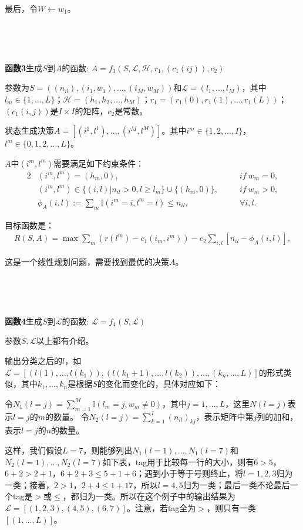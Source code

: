 \documentclass[a4paper,11pt]
{elsarticle}%
\begin{document}
最后，令$W\gets w_1$。

~

~


\textbf{函数3}生成$S$到$A$的函数: $A=f_3(S,\mathscr{L},\mathscr{H},r_1,(c_1(ij)),c_2)$

参数为$S=((n_{il}),(i_1,w_1),\ldots,(i_M,w_M))$和$\mathscr{L}=(l_1,\ldots,l_M)$，其中$l_m\in\{1,\ldots,L\}$；$\mathscr{H}=(h_1,h_2,\ldots,h_M)$；$r_1=(r_1(0),r_1(1),\ldots,r_1(L))$；$(c_1(i,j))$是$I\times I$的矩阵，$c_2$是常数。

状态生成决策$A=[(i^1,l^1),\ldots,(i^M,l^M)]$。其中$i^m\in\{1,2,\ldots,I\}$，$l^m\in\{0,1,2,\ldots,L\}$。

$A$中$(i^m,l^m)$需要满足如下约束条件：
\begin{alignat}{2}
&(i^m,l^m)=(h_m,0),~~~~~~ &if~ w_m=0, \label{s0-1}
\\
&(i^m,l^m)\in\{(i,l)|n_{il}>0,l\geq l_m\}\cup\{(h_m,0)\},~~~~~~~~&if~ w_m>0,   \label{s0-2}\\
&\phi_A(i,l):=\sum_{m}\mathbb{I}(i^m=i,l^m=l)\leq n_{il},~~~&\forall i,l.   \label{s0-3}
\end{alignat}

目标函数是：
\begin{align}\label{revenue}
R(S,A)=\max\sum\limits_{m}(r(l^m)-c_1(i_m,i^m))-c_2\sum\limits_{i,l}[n_{il}-\phi_A(i,l)],
\end{align}

这是一个线性规划问题，需要找到最优的决策$A$。


~


~

\textbf{函数4}生成$S$到$\mathcal{L}$的函数: $\mathcal{L}=f_4(S,\mathscr{L})$

参数$S,\mathscr{L}$以上都有介绍。

输出分类之后的$l$，如$\mathcal{L}=[(l(1),\ldots,l(k_1)),(l(k_1+1),\ldots,l(k_2)),\ldots,(k_n,\ldots,L)]$的形式类似，其中$k_1,\ldots,k_n$是根据$S$的变化而变化的，具体对应如下：

令$N_1(l=j)=\sum\limits_{m=1}^M\mathbb{I}(l_m=j,w_m\ne 0)$，其中$j=1,\ldots,L$，这里$N(l=j)$表示$l=j$的$m$的数量。
令$N_2(l=j)=\sum\limits_{k=1}^I(n_{il})_{kj}$，表示矩阵中第$j$列的加和，表示$l=j$的$n$的数量。

这样，我们假设$L=7$，则能够列出$N_1(l=1),\ldots,N_1(l=7)$和$N_2(l=1),\ldots,N_2(l=7)$如下表，tag用于比较每一行的大小，则有$6>5$，$6+2>2+1$，$6+2+3\leq 5+1+6$；遇到小于等于号则终止，将$l=1,2,3$归为一类；接着，$2>1$，$2+4\leq 1+17$，所以$l=4,5$归为一类；最后一类不论最后一个tag是$>$或$\leq$，都归为一类。所以在这个例子中的输出结果为$\mathcal{L}=[(1,2,3),(4,5),(6,7)]$。注意，若tag全为$>$，则只有一类$[(1,\ldots,L)]$。
\end{document}
